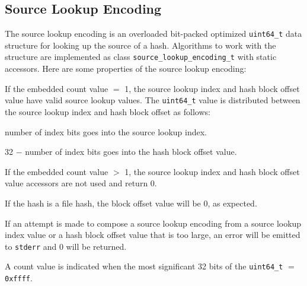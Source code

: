 \documentclass[12pt,twoside]{article}
\begin{document}
\subsection{Source Lookup Encoding}
The source lookup encoding is an overloaded bit-packed optimized
\texttt{uint64\_t}
data structure for looking up the source of a hash.
Algorithms to work with the structure are
implemented as class \texttt{source\_lookup\_encoding\_t}
with static accessors.
Here are some properties of the source lookup encoding:
\begin{compactitem}
\item If the embedded count value $=$ 1,
the source lookup index and hash block offset value
have valid source lookup values.
The \texttt{uint64\_t} value is distributed between the
source lookup index and hash block offset as follows:
  \begin{compactitem}
  \item number of index bits goes into the source lookup index.
  \item 32 $-$ number of index bits goes into the hash block offset value.
  \end{compactitem}
\item If the embedded count value $>$ 1,
the source lookup index and hash block offset value accessors
are not used and return 0.
\item If the hash is a file hash, the block offset value will be 0, as expected.
\item If an attempt is made to compose a source lookup encoding
from a source lookup index value or a hash block offset value
that is too large, an error will be emitted to \texttt{stderr}
and 0 will be returned.
\item A count value is indicated when the most significant 32 bits
of the \texttt{uint64\_t} $=$ \texttt{0xffff}.
\end{compactitem}

% 
\end{document}

